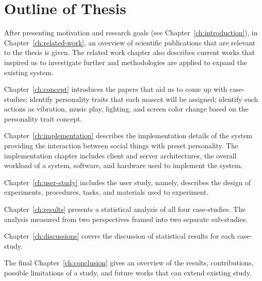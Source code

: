 \section{Outline of Thesis}
\label{sec:outline-of-thesis}
After presenting motivation and research goals (see Chapter~\ref{ch:introduction}), in Chapter~\ref{ch:related-work},
an overview of scientific publications that are relevant to the thesis is given.
The related work chapter also describes current works that inspired us to investigate further
and methodologies are applied to expand the existing system.

Chapter~\ref{ch:concept} introduces the papers that aid us to come up with case-studies;
identify personality traits that each mascot will be assigned;
identify such actions as vibration, music play, lighting,
and screen color change based on the personality trait concept.

Chapter~\ref{ch:implementation} describes the implementation details of the system providing the
interaction between social things with preset personality.
The implementation chapter includes client and server architectures,
the overall workload of a system, software, and hardware used to implement the system.

Chapter~\ref{ch:user-study} includes the user study, namely, describes the design of
experiments, procedures, tasks, and materials used to experiment.

Chapter~\ref{ch:results} presents a statistical analysis of all four case-studies.
The analysis measured from two perspectives framed into two separate sub-studies.

Chapter~\ref{ch:discussions} covers the discussion of statistical results for each case-study.

The final Chapter~\ref{ch:conclusion} gives an overview of the results, contributions,
possible limitations of a study, and future works that can extend existing study.